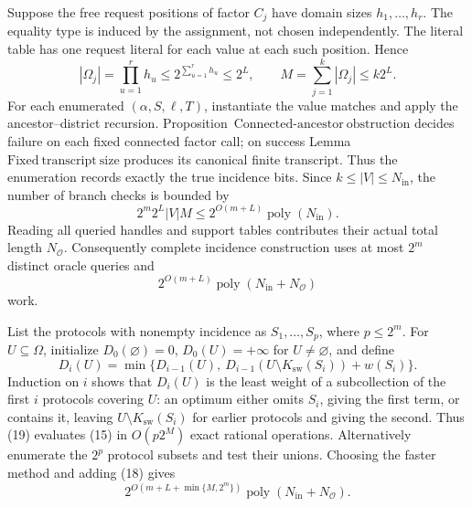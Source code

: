 Suppose the free request positions of factor \(C_j\) have domain sizes \(h_1,\ldots,h_r\).  The equality type is induced by the assignment, not chosen independently.  The literal table has one request literal for each value at each such position.  Hence
\[
 |\Omega_j|=\prod_{u=1}^{r}h_u
 \leq 2^{\sum_{u=1}^{r}h_u}
 \leq 2^L,
 \qquad
 M=\sum_{j=1}^{k}|\Omega_j|\leq k2^L.
 \tag{16}
\]
For each enumerated \((\alpha,S,\ell,T)\), instantiate the value matches and apply the ancestor--district recursion.  Proposition~\(\mathrm{Connected\mbox{-}ancestor\ obstruction}\) decides failure on each fixed connected factor call; on success Lemma~\(\mathrm{Fixed\ transcript\ size}\) produces its canonical finite transcript.  Thus the enumeration records exactly the true incidence bits.  Since \(k\leq |V|\leq N_{\mathrm{in}}\), the number of branch checks is bounded by
\[
 2^m2^L|V|M
 \leq 2^{O(m+L)}\operatorname{poly}(N_{\mathrm{in}}).
 \tag{17}
\]
Reading all queried handles and support tables contributes their actual total length \(N_{\mathcal O}\).  Consequently complete incidence construction uses at most \(2^m\) distinct oracle queries and
\[
 2^{O(m+L)}\operatorname{poly}(N_{\mathrm{in}}+N_{\mathcal O})
 \tag{18}
\]
work.

List the protocols with nonempty incidence as \(S_1,\ldots,S_p\), where \(p\leq2^m\).  For \(U\subseteq\Omega\), initialize \(D_0(\varnothing)=0\), \(D_0(U)=+\infty\) for \(U\ne\varnothing\), and define
\[
 D_i(U)=\min\{D_{i-1}(U),\ D_{i-1}(U\setminus K_{\mathrm{sw}}(S_i))+w(S_i)\}.
 \tag{19}
\]
Induction on \(i\) shows that \(D_i(U)\) is the least weight of a subcollection of the first \(i\) protocols covering \(U\): an optimum either omits \(S_i\), giving the first term, or contains it, leaving \(U\setminus K_{\mathrm{sw}}(S_i)\) for earlier protocols and giving the second.  Thus (19) evaluates (15) in \(O(p2^M)\) exact rational operations.  Alternatively enumerate the \(2^p\) protocol subsets and test their unions.  Choosing the faster method and adding (18) gives
\[
 2^{O(m+L+\min\{M,2^m\})}
 \operatorname{poly}(N_{\mathrm{in}}+N_{\mathcal O}).
 \tag{20}
\]

